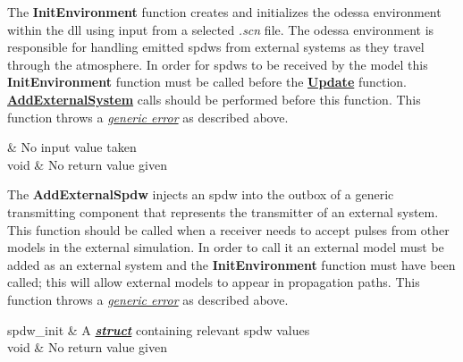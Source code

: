 %

    \hspace{\parindent}\unclass The \textcolor{red5}{\textbf{InitEnvironment}} function creates and initializes the \gls{odessa} environment within the \gls{dll} using input from a selected \textit{.scn} file. The \gls{odessa} environment is responsible for handling emitted \gls{spdw}s from external systems as they travel through the atmosphere. In order for \gls{spdw}s to be received by the model this \textcolor{red5}{\textbf{InitEnvironment}} function must be called before the \hyperref[tab:Update]{\textcolor{red5}{\textbf{Update}}} function. \hyperref[tab:AddExternalSystem]{\textcolor{red5}{\textbf{AddExternalSystem}}} calls should be performed before this function. This function throws a \hyperlink{genericerror}{\textit{generic error}} as described above.

    {
             & No input value taken\\
    }{
        void & No return value given\\
    }
%
%

    \hspace{\parindent}\unclass The \textcolor{red5}{\textbf{AddExternalSpdw}} injects an \gls{spdw} into the outbox of a generic transmitting component that represents the transmitter of an external system. This function should be called when a receiver needs to accept pulses from other models in the external simulation. In order to call it an external model must be added as an external system and the \textcolor{red5}{\textbf{InitEnvironment}} function must have been called; this will allow external models to appear in propagation paths.  This function throws a \hyperlink{genericerror}{\textit{generic error}} as described above.

    {
        spdw\_init & A \textbf{\textit{\hyperref[tab:spdwinitstruct]{struct}}} containing relevant \gls{spdw} values\\
    }{
        void & No return value given\\
    }

%
%

